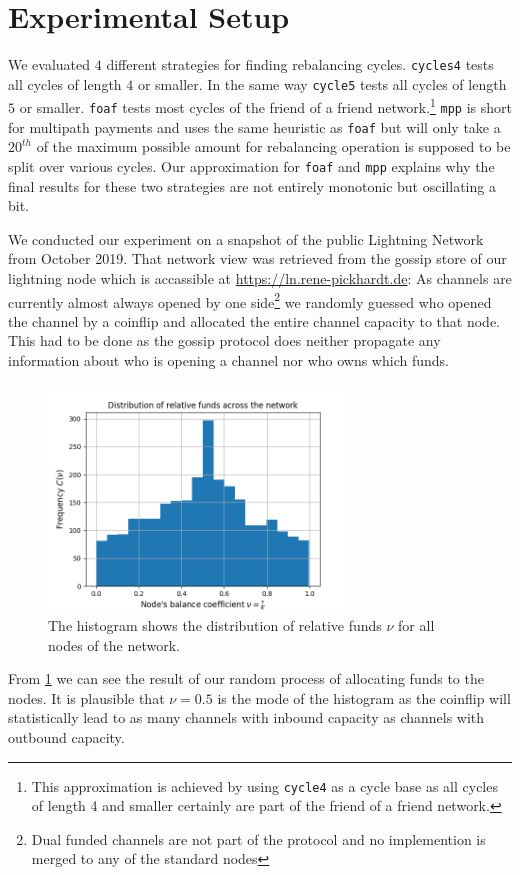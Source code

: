 \documentclass[a4paper]{paper}
\begin{document}
\section{Experimental Setup}
\label{sec:setup}

We evaluated $4$ different strategies for finding rebalancing cycles. \texttt{cycles4} tests all cycles of length $4$ or smaller. In the same way \texttt{cycle5} tests all cycles of length $5$ or smaller. \texttt{foaf} tests most cycles of the friend of a friend network.\footnote{This approximation is achieved by using \texttt{cycle4} as a cycle base as all cycles of length 4 and smaller certainly are part of the friend of a friend network.}
\texttt{mpp} is short for multipath payments and uses the same heuristic as \texttt{foaf} but will only take a $20^{th}$ of the maximum possible amount for rebalancing operation is supposed to be split over various cycles.
Our approximation for \texttt{foaf} and \texttt{mpp} explains why the final results for these two strategies are not entirely monotonic but oscillating a bit.

We conducted our experiment on a snapshot of the public Lightning Network from October 2019.
That network view was retrieved from the gossip store of our lightning node which is accassible at \url{https://ln.rene-pickhardt.de}:
As channels are currently almost always opened by one side\footnote{Dual funded channels are not part of the protocol and no implemention is merged to any of the standard nodes} we randomly guessed who opened the channel by a coinflip and allocated the entire channel capacity to that node.
This had to be done as the gossip protocol does neither propagate any information about who is opening a channel nor who owns which funds.
\begin{figure}
 \centering
 \includegraphics[width=8cm]{code/vs/fig/distribution_of_nus.png}
 \caption{The histogram shows the distribution of relative funds $\nu$ for all nodes of the network.}
 \label{fig:initial_funds}
\end{figure}
From \cref{fig:initial_funds} we can see the result of our random process of allocating funds to the nodes.
It is plausible that $\nu=0.5$ is the mode of the histogram as the coinflip will statistically lead to as many channels with inbound capacity as channels with outbound capacity.
\end{document}
